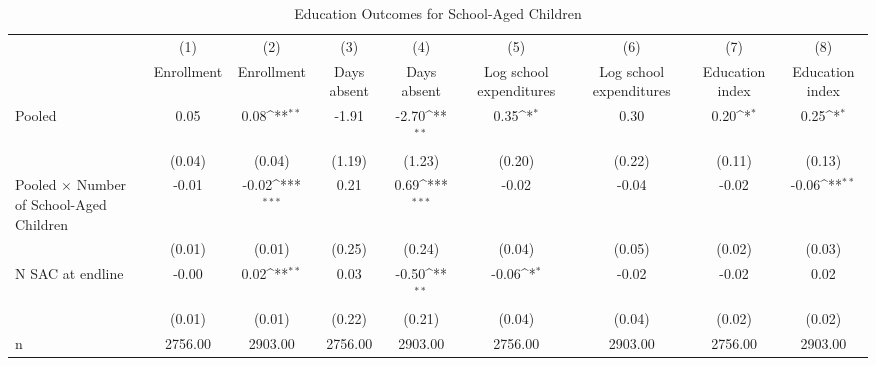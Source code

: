 \begin{table}[htbp]\centering
\def\sym#1{\ifmmode^{#1}\else\(^{#1}\)\fi}
\caption{Education Outcomes for School-Aged Children\label{endline\_educ\_indiv}}
\begin{tabular}{l*{8}{c}}
\toprule
                    &\multicolumn{1}{c}{(1)}&\multicolumn{1}{c}{(2)}&\multicolumn{1}{c}{(3)}&\multicolumn{1}{c}{(4)}&\multicolumn{1}{c}{(5)}&\multicolumn{1}{c}{(6)}&\multicolumn{1}{c}{(7)}&\multicolumn{1}{c}{(8)}\\
                    &\multicolumn{1}{c}{Enrollment}&\multicolumn{1}{c}{Enrollment}&\multicolumn{1}{c}{Days absent}&\multicolumn{1}{c}{Days absent}&\multicolumn{1}{c}{Log school expenditures}&\multicolumn{1}{c}{Log school expenditures}&\multicolumn{1}{c}{Education index}&\multicolumn{1}{c}{Education index}\\
\midrule
Pooled              &        0.05         &        0.08\sym{**} &       -1.91         &       -2.70\sym{**} &        0.35\sym{*}  &        0.30         &        0.20\sym{*}  &        0.25\sym{*}  \\
                    &      (0.04)         &      (0.04)         &      (1.19)         &      (1.23)         &      (0.20)         &      (0.22)         &      (0.11)         &      (0.13)         \\\addlinespace
Pooled $\times$ Number of School-Aged Children&       -0.01         &       -0.02\sym{***}&        0.21         &        0.69\sym{***}&       -0.02         &       -0.04         &       -0.02         &       -0.06\sym{**} \\
                    &      (0.01)         &      (0.01)         &      (0.25)         &      (0.24)         &      (0.04)         &      (0.05)         &      (0.02)         &      (0.03)         \\\addlinespace
N SAC at endline    &       -0.00         &        0.02\sym{**} &        0.03         &       -0.50\sym{**} &       -0.06\sym{*}  &       -0.02         &       -0.02         &        0.02         \\
                    &      (0.01)         &      (0.01)         &      (0.22)         &      (0.21)         &      (0.04)         &      (0.04)         &      (0.02)         &      (0.02)         \\\addlinespace
\midrule
n                   &     2756.00         &     2903.00         &     2756.00         &     2903.00         &     2756.00         &     2903.00         &     2756.00         &     2903.00         \\
\bottomrule
\end{tabular}
\end{table}
